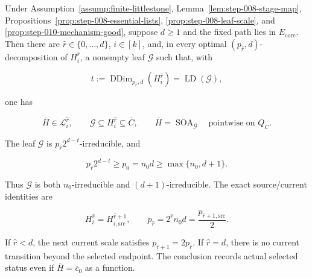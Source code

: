 \begin{proposition}\label{prop:step-012-selected-leaf}
Under Assumption~\ref{assump:finite-littlestone}, Lemma~\ref{lem:step-008-stage-map}, 
Propositions~\ref{prop:step-008-essential-lists},
\ref{prop:step-008-leaf-scale}, and
\ref{prop:step-010-mechanism-good}, suppose \(d\ge1\) and the fixed path
lies in \(E_{\mathrm{core}}\). Then there are
\(\widehat r\in\{0,\ldots,d\}\), \(i\in[k]\), and, in every optimal
\((p_{\widehat r},d)\)-decomposition of
\(H_i^{\widehat r}\), a nonempty leaf \(\mathcal G\) such that, with

\[
 t:=\operatorname{DDim}_{p_{\widehat r},d}(H_i^{\widehat r})
   =\operatorname{LD}(\mathcal G),
\tag{18}
\]

one has

\[
 \bar H\in\mathcal L_i^{\widehat r},
 \qquad
 \mathcal G\subseteq H_i^{\widehat r}\subseteq\bar C,
 \qquad
 \bar H=\operatorname{SOA}_{\mathcal G}
 \quad\text{pointwise on }Q_C.
\tag{19}
\]

The leaf \(\mathcal G\) is
\(p_{\widehat r}2^{d-t}\)-irreducible, and

\[
 p_{\widehat r}2^{d-t}
 \ge p_0=n_0d
 \ge\max\{n_0,d+1\}.
\tag{20}
\]

Thus \(\mathcal G\) is both \(n_0\)-irreducible and
\((d+1)\)-irreducible. The exact source/current identities are

\[
 H_i^{\widehat r}=H_{i,\mathrm{src}}^{\widehat r+1},
 \qquad
 p_{\widehat r}
 =2^{\widehat r}n_0d
 =\frac{p_{\widehat r+1,\mathrm{src}}}{2}.
\tag{21}
\]

If \(\widehat r<d\), the next current scale satisfies
\(p_{\widehat r+1}=2p_{\widehat r}\). If \(\widehat r=d\), there is no
current transition beyond the selected endpoint. The conclusion records
actual selected status even if \(\bar H=\bar c_0\) as a function.


\end{proposition}

